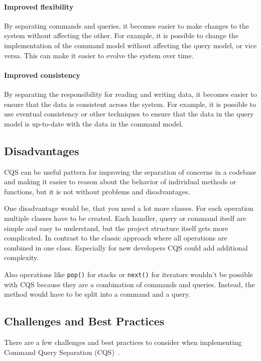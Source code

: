 \documentclass[11pt,conference]{IEEEtran}
\begin{document}
\paragraph{Improved flexibility}
By separating commands and queries, it becomes easier to make changes to the system without affecting the other. For example, it is possible to change the implementation of the command model without affecting the query model, or vice versa. This can make it easier to evolve the system over time.

\paragraph{Improved consistency}
 By separating the responsibility for reading and writing data, it becomes easier to ensure that the data is consistent across the system. For example, it is possible to use eventual consistency or other techniques to ensure that the data in the query model is up-to-date with the data in the command model.

\subsection{Disadvantages}

CQS can be useful pattern for improving the separation of concerns in a codebase and making it easier to reason about the behavior of individual methods or functions, but it is not without problems and disadvantages.

One disadvantage would be, that you need a lot more classes.
For each operation multiple classes have to be created.
Each handler, query or command itself are simple and easy to understand, but the project structure itself gets more complicated.
In contrast to the classic approach where all operations are combined in one class.
Especially for new developers CQS could add additional complexity.

Also operations like \texttt{pop()} for stacks or \texttt{next()} for iterators wouldn't be possible with CQS because they are a combination of commands and queries.
Instead, the method would have to be split into a command and a query.

\subsection{Challenges and Best Practices}

There are a few challenges and best practices to consider when implementing Command Query Separation (CQS)~\cite{martinfowler-cqs}.
\end{document}
